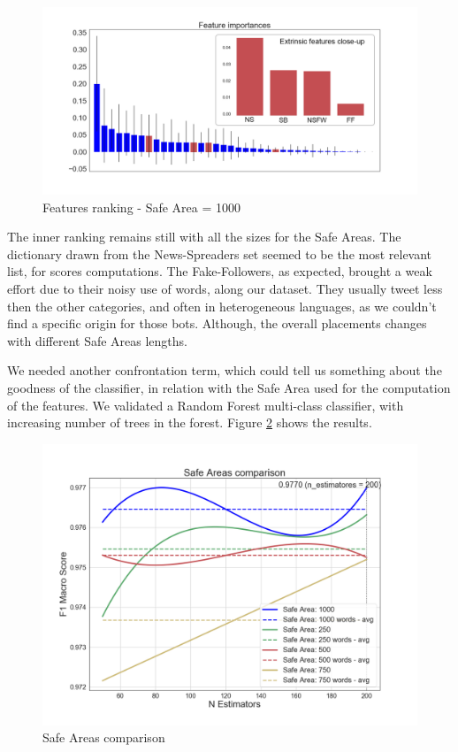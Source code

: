 \begin{figure}[htp!]
	\includegraphics[width=\columnwidth]{chapter4/figure/features_importances_1000.png}
	\caption{Features ranking - Safe Area = 1000}
	\label{fig:1000_overall}
\end{figure}
The inner ranking remains still with all the sizes for the Safe Areas. The dictionary drawn from the News-Spreaders set seemed to be the most relevant list, for scores computations. The Fake-Followers, as expected, brought a weak effort due to their noisy use of words, along our dataset. They usually tweet less then the other categories, and often in heterogeneous languages, as we couldn't find a specific origin for those bots. Although, the overall placements changes with different Safe Areas lengths. 

We needed another confrontation term, which could tell us something about the goodness of the classifier, in relation with the Safe Area used for the computation of the features.
We validated a Random Forest multi-class classifier, with increasing number of trees in the forest. Figure \ref{fig:safe_areas} shows the results.

\begin{figure}[htp!]
	\centering
	\includegraphics[width=\columnwidth]{chapter4/figure/dict_comparison.png}
	\caption{Safe Areas comparison}
	\label{fig:safe_areas}
\end{figure}

